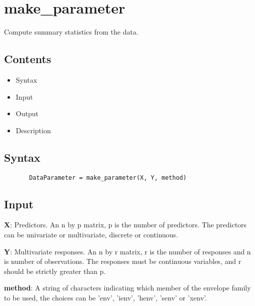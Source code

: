 \documentclass[a4paper,11pt,openany]{memoir}
\begin{document}
\newpage

\rmfamily
\color{black}\section{make\_parameter}

\begin{par}
Compute summary statistics from the data.
\end{par} \vspace{1em}

\subsection*{Contents}

\begin{itemize}
\setlength{\itemsep}{-1ex}
   \item Syntax
   \item Input
   \item Output
   \item Description
\end{itemize}


\subsection*{Syntax}


\begin{verbatim}       DataParameter = make_parameter(X, Y, method)\end{verbatim}
    

\subsection*{Input}

\begin{par}
\textbf{X}: Predictors. An n by p matrix, p is the number of predictors. The predictors can be univariate or multivariate, discrete or continuous.
\end{par} \vspace{1em}
\begin{par}
\textbf{Y}: Multivariate responses. An n by r matrix, r is the number of responses and n is number of observations. The responses must be continuous variables, and r should be strictly greater than p.
\end{par} \vspace{1em}
\begin{par}
\textbf{method}: A string of characters indicating which member of the envelope family to be used, the choices can be 'env', 'ienv', 'henv', 'senv' or 'xenv'.
\end{par} \vspace{1em}
\end{document}
